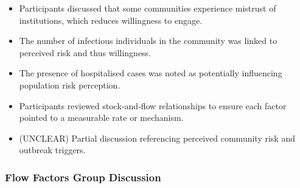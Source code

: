 \documentclass{article}
\begin{document}
\begin{itemize}
    \item Participants discussed that some communities experience mistrust of institutions, which reduces willingness to engage.
    \item The number of infectious individuals in the community was linked to perceived risk and thus willingness.
    \item The presence of hospitalised cases was noted as potentially influencing population risk perception.
    \item Participants reviewed stock‑and‑flow relationships to ensure each factor pointed to a measurable rate or mechanism.
    \item (UNCLEAR) Partial discussion referencing perceived community risk and outbreak triggers.
\end{itemize}

\subsubsection{Flow Factors Group Discussion}
\end{document}
